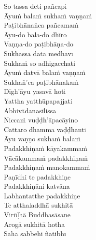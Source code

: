 \begin{verses}
  So tassa deti pañcapi\\
  Āyuṁ balaṁ sukhaṁ vaṇṇaṁ\\
  Paṭibhānañca pañcamaṁ\makeatletter\hyperlink{endnote122-appendix}\makeatother\\
  Āyu-do bala-do dhīro\\
  Vaṇṇa-do paṭibhāṇa-do\\
  Sukhassa dātā medhāvī\\
  Sukhaṁ so adhigacchati\\
  Āyuṁ datvā balaṁ vaṇṇaṁ\\
  Sukhañ'ca paṭibhānakaṁ\makeatletter\hyperlink{endnote123-appendix}\makeatother\\
  Dīgh'āyu yasavā hoti\\
  Yattha yatthūpapajjati\\
  Abhivādanasīlissa\\
  Niccaṁ vuḍḍh'āpacāyino\\
  Cattāro dhammā vaḍḍhanti\\
  Āyu vaṇṇo sukhaṁ balaṁ\\
  Padakkhiṇaṁ kāyakammaṁ\\
  Vācākammaṁ padakkhiṇaṁ\\
  Padakkhiṇaṁ manokammaṁ\\
  Paṇīdhi te padakkhiṇe\\
  Padakkhiṇāni katvāna\\
  Labhantatthe padakkhiṇe\\
  Te atthaladdhā sukhitā\\
  Virūḷhā Buddhasāsane\\
  Arogā sukhitā hotha\\
  Saha sabbehi ñātibhī
\end{verses}

